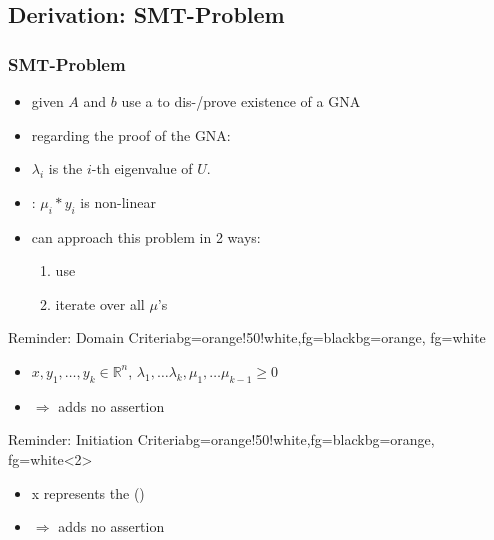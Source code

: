 \subsection{Derivation: SMT-Problem}
\begin{frame}
	\frametitle{SMT-Problem}
	\begin{itemize}
		\item given $A$ and $b$ use a \solver to dis-/prove existence of a GNA
		\item regarding the proof of the GNA:
		\item[]	\begin{definition}
					$\lambda_i$ is the $i$-th eigenvalue of $U$.
				\end{definition}
		\item {}: $\mu_i*y_i$ is non-linear
		\item[] can approach this problem in 2 ways:
			\begin{enumerate}
				\item use \qfnia
				\item iterate over all $\mu$'s
			\end{enumerate}
	\end{itemize}
\end{frame}

\begin{frame}
	\begin{variableblock}{Reminder: Domain Criteria}{bg=orange!50!white,fg=black}{bg=orange, fg=white}
		\begin{itemize}
			\setlength{\itemindent}{1cm}
			\item[(domain)] $x, y_1, \dots, y_k \in \mathbb{R}^n$, $\lambda_1, \dots \lambda_k, \mu_1, \dots \mu_{k-1} \ge 0$
		\end{itemize}
	\end{variableblock}
	\begin{itemize}
		\item[] $\Rightarrow$ adds no assertion
	\end{itemize}
	\begin{variableblock}{Reminder: Initiation Criteria}{bg=orange!50!white,fg=black}{bg=orange, fg=white}<2>
		\begin{itemize}
			\setlength{\itemindent}{1cm}
			\item[(init)] x represents the \startterm (\stem)
		\end{itemize}
	\end{variableblock}
	\begin{itemize}
		\item[]<2> $\Rightarrow$ adds no assertion
	\end{itemize}
	
\end{frame}

